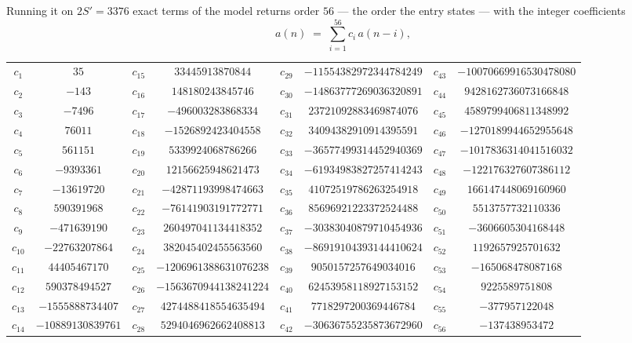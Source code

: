 \documentclass[11pt,a4paper]{article}
\theoremstyle{plain}
\theoremstyle{definition}
\begin{document}
Running it on $2S'=3376$ exact terms of the model returns order $56$ --- the order the
entry states --- with the integer coefficients
\[
a(n)\;=\;\sum_{i=1}^{56}c_i\,a(n-i),
\]
\begin{center}\small
\begin{tabular}{cccccccc}
$c_{1}$ & $35$ & $c_{15}$ & $33445913870844$ & $c_{29}$ & $-11554382972344784249$ & $c_{43}$ & $-10070669916530478080$ \\
$c_{2}$ & $-143$ & $c_{16}$ & $148180243845746$ & $c_{30}$ & $-14863777269036320891$ & $c_{44}$ & $9428162736073166848$ \\
$c_{3}$ & $-7496$ & $c_{17}$ & $-496003283868334$ & $c_{31}$ & $23721092883469874076$ & $c_{45}$ & $4589799406811348992$ \\
$c_{4}$ & $76011$ & $c_{18}$ & $-1526892423404558$ & $c_{32}$ & $34094382910914395591$ & $c_{46}$ & $-1270189944652955648$ \\
$c_{5}$ & $561151$ & $c_{19}$ & $5339924068786266$ & $c_{33}$ & $-36577499314452940369$ & $c_{47}$ & $-1017836314041516032$ \\
$c_{6}$ & $-9393361$ & $c_{20}$ & $12156625948621473$ & $c_{34}$ & $-61934983827257414243$ & $c_{48}$ & $-122176327607386112$ \\
$c_{7}$ & $-13619720$ & $c_{21}$ & $-42871193998474663$ & $c_{35}$ & $41072519786263254918$ & $c_{49}$ & $166147448069160960$ \\
$c_{8}$ & $590391968$ & $c_{22}$ & $-76141903191772771$ & $c_{36}$ & $85696921223372524488$ & $c_{50}$ & $5513757732110336$ \\
$c_{9}$ & $-471639190$ & $c_{23}$ & $260497041134418352$ & $c_{37}$ & $-30383040879710454936$ & $c_{51}$ & $-3606605304168448$ \\
$c_{10}$ & $-22763207864$ & $c_{24}$ & $382045402455563560$ & $c_{38}$ & $-86919104393144410624$ & $c_{52}$ & $1192657925701632$ \\
$c_{11}$ & $44405467170$ & $c_{25}$ & $-1206961388631076238$ & $c_{39}$ & $9050157257649034016$ & $c_{53}$ & $-165068478087168$ \\
$c_{12}$ & $590378494527$ & $c_{26}$ & $-1563670944138241224$ & $c_{40}$ & $62453958118927153152$ & $c_{54}$ & $9225589751808$ \\
$c_{13}$ & $-1555888734407$ & $c_{27}$ & $4274488418554635494$ & $c_{41}$ & $7718297200369446784$ & $c_{55}$ & $-377957122048$ \\
$c_{14}$ & $-10889130839761$ & $c_{28}$ & $5294046962662408813$ & $c_{42}$ & $-30636755235873672960$ & $c_{56}$ & $-137438953472$ \\
\end{tabular}
\end{center}
\end{document}
